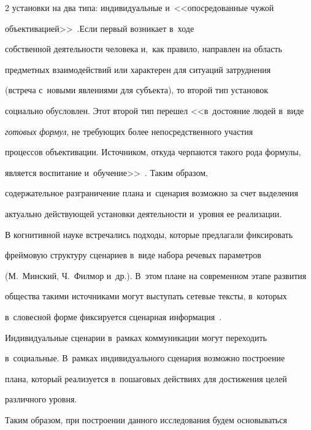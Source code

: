 \begin{multicols}{2}
установки на два типа: индивидуальные и~<<опосредованные чужой 

объективацией>>~\cite[с.~47]{7-sm}.\linebreak Если первый возникает в~ходе 

собственной дея\-тель\-ности человека и,~как правило, на\-прав\-лен на об\-ласть 

предметных взаимодействий или характерен для ситуаций затруднения 

(встреча с~новыми явлениями для субъекта), то второй тип установок 

социально обуслов\-лен. Этот второй тип перешел <<в~достояние людей в~виде 

\textit{готовых \mbox{формул}}, не тре\-бу\-ющих более непосредственного учас\-тия 

процессов объективации. Источником, откуда черпаются такого рода формулы, 

является воспитание и~обуче\-ние>>~\cite[с.~203]{8-sm}. Таким образом, 

содержательное разграничение плана и~сценария воз\-мож\-но за счет выделения 

актуально дей\-ст\-ву\-ющей уста\-нов\-ки де\-я\-тель\-ности и~уров\-ня ее реа\-ли\-за\-ции.

{



}

  

  В когнитивной науке встречались подходы, которые предлагали фиксировать 

фреймовую структуру сценариев в~виде набора речевых параметров 

(М.~Минский, Ч.~Филмор и~др.). В~этом плане на современном этапе развития 

общества такими источниками могут выступать сетевые тексты, в~которых 

в~словесной форме фиксируется сценарная информация~\cite{9-sm}. 

Индивидуальные сценарии в~рамках коммуникации могут переходить 

в~социальные. В~рамках индивидуального сценария возможно построение 

плана, который реализуется в~пошаговых действиях для достижения целей 

различного \mbox{уровня}. 

  

  Таким образом, при построении данного исследования будем основываться 


\end{multicols}
